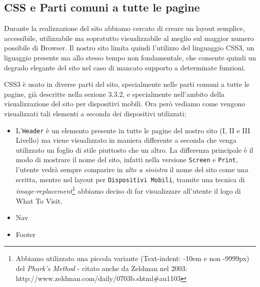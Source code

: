 \subsection{CSS e Parti comuni a tutte le pagine}
Durante la realizzazione del sito abbiamo cercato di creare un layout semplice, accessibile, utilizzabile ma sopratutto visualizzabile al meglio sul maggior numero possibile di Browser. Il nostro sito limita quindi l'utilizzo del linguaggio CSS3, un liguaggio presente ma allo stesso tempo non fondamentale, che consente quindi un degrado elegante del sito nel caso di mancato supporto a determinate funzioni.

CSS3 è usato in diverse parti del sito, specialmente nelle parti comuni a tutte le pagine, già descritte nella sezione 3.3.2, e specialmente nell'ambito della visualizzazione del sito per dispositivi mobili. Ora però vediamo come vengono visualizzati tali elementi a seconda dei dispositivi utilizzati:
\begin{itemize}
\item L'\texttt{Header} è un elemento presente in tutte le pagine del nostro sito (I, II e III Livello) ma viene visualizzato in maniera differente a seconda che venga utilizzato un foglio di stile piuttosto che un altro. La differenza principale è il modo di mostrare il nome del sito, infatti nella versione \texttt{Screen} e \texttt{Print}, l'utente vedrà sempre comparire in \textit{alto a sinistra} il nome del sito come una scritta, mentre nel layout per \texttt{Dispositivi Mobili}, tramite una tecnica di \textit{image-replacement}\footnote{Abbiamo utilizzato una piccola variante (Text-indent: -10em e non -9999px) del \textit{Phark's Method} - citato anche da Zeldman nel 2003: http://www.zeldman.com/daily/0703b.shtml\#au1103} abbiamo deciso di far visualizzare all'utente il logo di What To Visit.
\item Nav
\item Footer
\end{itemize}